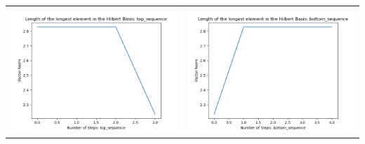 \documentclass[10pt]{article}
\begin{document}
\begin{tabular}{c|c}
\begin{minipage}{.4\textwidth}
\includegraphics[width=\textwidth]{"DATA/5d/5 generators 1 bound D/top_sequence LENGTH"}
\end{minipage} &
\begin{minipage}{.4\textwidth}
\includegraphics[width=\textwidth]{"DATA/5d/5 generators 1 bound D bottomup/bottom_sequence LENGTH"}
\end{minipage}
\end{tabular}
\end{document}
